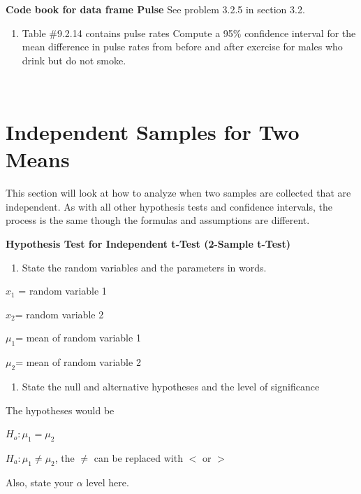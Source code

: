 \documentclass[
]{book}
\providecommand{\tightlist}{%
  \setlength{\itemsep}{0pt}\setlength{\parskip}{0pt}}
\begin{document}
\textbf{Code book for data frame Pulse} See problem 3.2.5 in section 3.2.

\begin{enumerate}
\def\labelenumi{\arabic{enumi}.}
\setcounter{enumi}{11}
\tightlist
\item
  Table \#9.2.14 contains pulse rates Compute a 95\% confidence interval for the mean difference in pulse rates from before and after exercise for males who drink but do not smoke.
\end{enumerate}

\textbf{\\
}

\hypertarget{independent-samples-for-two-means}{%
\section{Independent Samples for Two Means}\label{independent-samples-for-two-means}}

This section will look at how to analyze when two samples are collected that are independent. As with all other hypothesis tests and confidence intervals, the process is the same though the formulas and assumptions are different.

\textbf{Hypothesis Test for Independent t-Test (2-Sample t-Test)}

\begin{enumerate}
\def\labelenumi{\arabic{enumi}.}
\tightlist
\item
  State the random variables and the parameters in words.
\end{enumerate}

\(x_1\) = random variable 1

\(x_2\)= random variable 2

\(\mu_1\)= mean of random variable 1

\(\mu_2\)= mean of random variable 2

\begin{enumerate}
\def\labelenumi{\arabic{enumi}.}
\setcounter{enumi}{1}
\tightlist
\item
  State the null and alternative hypotheses and the level of significance
\end{enumerate}

The hypotheses would be

\(H_o:\mu_1=\mu_2\)

\(H_a:\mu_1\ne \mu_2\), the \(\ne\) can be replaced with \(<\) or \(>\)

Also, state your \(\alpha\) level here.
\end{document}
